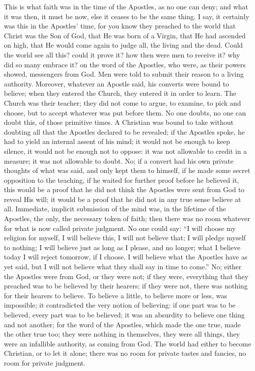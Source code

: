 This is what faith was in the time of the Apostles, as no one can
deny; and what it was then, it must be now, else it ceases to be the
same thing. I say, it certainly was this in the Apostles' time, for
you know they preached to the world that Christ was the Son of God,
that He was born of a Virgin, that He had ascended on high, that He
would come again to judge all, the living and the dead. Could the
world see all this? could it prove it? how then were men to receive
it? why did so many embrace it? on the word of the Apostles, who were,
as their powers showed, messengers from God. Men were told to submit
their reason to a living authority. Moreover, whatever an Apostle
said, his converts were bound to believe; when they entered the
Church, they entered it in order to learn. The Church was their
teacher; they did not come to argue, to examine, to pick and choose,
but to accept whatever was put before them. No one doubts, no one can
doubt this, of those primitive times. A Christian was bound to take
without doubting all that the Apostles declared to be revealed; if the
Apostles spoke, he had to yield an internal assent of his mind; it
would not be enough to keep silence, it would not be enough not to
oppose: it was not allowable to credit in a measure; it was not
allowable to doubt. No; if a convert had his own private thoughts of
what was said, and only kept them to himself, if he made some secret
opposition to the teaching, if he waited for further proof before he
believed it, this would be a proof that he did not think the Apostles
were sent from God to reveal His will; it would be a proof that he did
not in any true sense believe at all. Immediate, implicit submission
of the mind was, in the lifetime of the Apostles, the only, the
necessary token of faith; then there was no room whatever for what is
now called private judgment. No one could say: ``I will choose my
religion for myself, I will believe this, I will not believe that; I
will pledge myself to nothing; I will believe just as long as I
please, and no longer; what I believe today I will reject tomorrow, if
I choose. I will believe what the Apostles have as yet said, but I
will not believe what they shall say in time to come.'' No; either
the Apostles were from God, or they were not; if they were, everything
that they preached was to be believed by their hearers; if they were
not, there was nothing for their hearers to believe. To believe a
little, to believe more or less, was impossible; it contradicted the
very notion of believing: if one part was to be believed, every part
was to be believed; it was an absurdity to believe one thing and not
another; for the word of the Apostles, which made the one true, made
the other true too; they were nothing in themselves, they were all
things, they were an infallible authority, as coming from God. The
world had either to become Christian, or to let it alone; there was no
room for private tastes and fancies, no room for private judgment.

